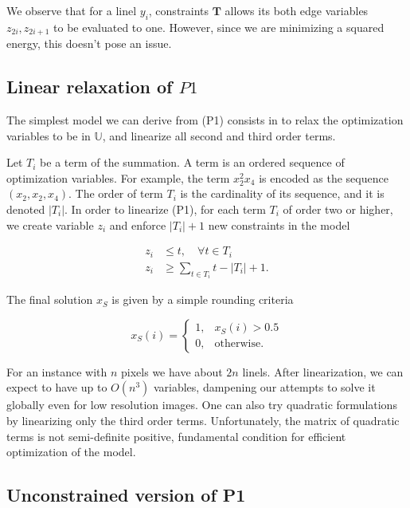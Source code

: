 We observe that for a linel $y_i$, constraints $\mathbf{T}$ allows its both edge variables $z_{2i},z_{2i+1}$ to be evaluated to one. However, since we are minimizing a squared energy, this doesn't pose an issue.




\subsection{Linear relaxation of $P1$}

	The simplest model we can derive from (P1) consists in to relax the optimization variables to be in $\mathbb{U}$, and linearize all second and third order terms. 
	
	Let $T_i$ be a term of the summation. A term is an ordered sequence of optimization variables. For example, the term $x_2^2x_4$ is encoded as the sequence $(x_2,x_2,x_4)$. The order of term $T_i$ is the cardinality of its sequence, and it is denoted $|T_i|$. In order to linearize (P1), for each term $T_i$ of order two or higher, we create variable $z_i$ and enforce $|T_i|+1$ new constraints in the model
	
	\begin{align*}
		z_i &\leq t, \quad \forall t \in T_i \\
		z_i &\geq \sum_{t \in T_i}{t} - |T_i| + 1.		
	\end{align*}

	The final solution $x_S$ is given by a simple rounding criteria
	
\[
	x_S(i) = \left\{ \begin{array}{ll}

		 	1,& x_S(i) > 0.5\\
		 	0,& \text{otherwise}.
 	
	\end{array}\right.
\]	

	For an instance with $n$ pixels we have about $2n$ linels. After linearization, we can expect to have up to $O(n^3)$ variables, dampening our attempts to solve it globally even for low resolution images. One can also try quadratic formulations by linearizing only the third order terms. Unfortunately, the matrix of quadratic terms is not semi-definite positive, fundamental condition for efficient optimization of the model.
	


\subsection{Unconstrained version of P1}

